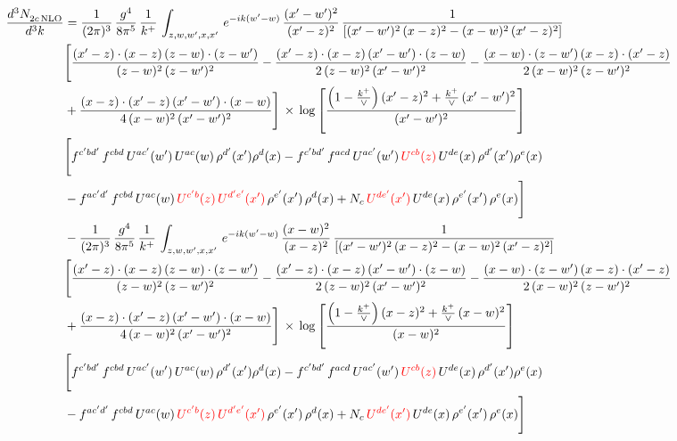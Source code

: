 \documentclass[9pt]{article}
\numberwithin{equation}{section}
\begin{document}
\begin{align}
    \frac{d^{3}N_{2c\,\rm NLO}^{\rm}}{d^{3}k}  & =  \frac{1}{(2\pi)^{3}}\, \frac{g^{4}}{8\pi^{5}}\,\frac{1}{k^{+}}\,\int_{z,w,w^{\prime},x,x'}\, e^{-ik(w^{\prime}-w)}\,\frac{(x'-w')^{2}}{(x'-z)^{2}}\, \frac{1}{\left[(x'-w')^{2}\, (x-z)^{2} - (x-w)^{2}\, (x'-z)^{2}\right]} \notag \\ & \Bigg[\frac{(x'-z)\cdot (x-z)\, (z-w)\cdot (z-w')}{(z-w)^{2}\, (z-w')^{2}}-\frac{(x'-z)\cdot (x-z)\, (x'-w')\cdot (z-w)}{2\, (z-w)^{2}\, (x'-w')^{2}} -\frac{(x-w)\cdot (z-w')\, (x-z)\cdot (x'-z)}{2\, (x-w)^{2}\, (z-w')^{2}}\notag \\ & +\frac{(x-z)\cdot (x'-z)\, (x'-w')\cdot (x-w)}{4\, (x-w)^{2}\, (x'-w')^{2}}\Bigg]\,\times\, \log{\left[\frac{\left(1-\frac{k^{+}}{\vee}\right)(x'-z)^{2}+\frac{k^{+}}{\vee}\,(x'-w')^{2}}{(x'-w')^{2}}\right]} \notag \\ &  \Bigg[f^{c'bd'}\,f^{cbd}\, U^{ac'}(w')\,U^{ac}(w)\,\rho^{d'}(x')\rho^{d}(x)- f^{c'bd'}\,f^{acd}\,U^{ac'}(w')\,{\color{red}U^{cb}(z)}\,U^{de}(x)\,\rho^{d'}(x')\rho^{e}(x) \notag \\ & -f^{ac'd'}\,f^{cbd}\,U^{ac}(w)\,{\color{red}U^{c'b}(z)\,U^{d'e'}(x')}\,\rho^{e'}(x')\,\rho^{d}(x) +N_{c}\,{\color{red}U^{de'}(x')}\,U^{de}(x)\,\rho^{e'}(x')\,\rho^{e}(x)\Bigg] \notag \\
& -\frac{1}{(2\pi)^{3}}\, \frac{g^{4}}{8\pi^{5}}\,\frac{1}{k^{+}}\,\int_{z,w,w^{\prime},x,x'}\, e^{-ik(w^{\prime}-w)}\,\frac{(x-w)^{2}}{(x-z)^{2}}\, \frac{1}{\left[(x'-w')^{2}\, (x-z)^{2} - (x-w)^{2}\, (x'-z)^{2}\right]} \notag \\ & \Bigg[\frac{(x'-z)\cdot (x-z)\, (z-w)\cdot (z-w')}{(z-w)^{2}\, (z-w')^{2}}-\frac{(x'-z)\cdot (x-z)\, (x'-w')\cdot (z-w)}{2\, (z-w)^{2}\, (x'-w')^{2}} -\frac{(x-w)\cdot (z-w')\, (x-z)\cdot (x'-z)}{2\, (x-w)^{2}\, (z-w')^{2}}\notag \\ & +\frac{(x-z)\cdot (x'-z)\, (x'-w')\cdot (x-w)}{4\, (x-w)^{2}\, (x'-w')^{2}}\Bigg]\,\times\, \log{\left[\frac{\left(1-\frac{k^{+}}{\vee}\right)(x-z)^{2}+\frac{k^{+}}{\vee}\,(x-w)^{2}}{(x-w)^{2}}\right]} \notag \\ &  \Bigg[f^{c'bd'}\,f^{cbd}\, U^{ac'}(w')\,U^{ac}(w)\,\rho^{d'}(x')\rho^{d}(x)- f^{c'bd'}\,f^{acd}\,U^{ac'}(w')\,{\color{red}U^{cb}(z)}\,U^{de}(x)\,\rho^{d'}(x')\rho^{e}(x) \notag \\ & -f^{ac'd'}\,f^{cbd}\,U^{ac}(w)\,{\color{red}U^{c'b}(z)\,U^{d'e'}(x')}\,\rho^{e'}(x')\,\rho^{d}(x) +N_{c}\,{\color{red}U^{de'}(x')}\,U^{de}(x)\,\rho^{e'}(x')\,\rho^{e}(x)\Bigg]
\end{align}
\end{document}
